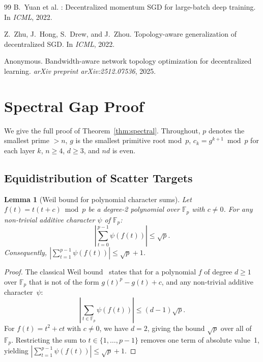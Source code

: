 \documentclass{article}
\newtheorem{lemma}[theorem]{Lemma}
\begin{document}
\begin{thebibliography}{99}
B.~Yuan et al.
: Decentralized momentum {SGD} for large-batch deep training.
\newblock In \emph{ICML}, 2022.

Z.~Zhu, J.~Hong, S.~Drew, and J.~Zhou.
\newblock Topology-aware generalization of decentralized {SGD}.
\newblock In \emph{ICML}, 2022.

Anonymous.
\newblock Bandwidth-aware network topology optimization for decentralized learning.
\newblock \emph{arXiv preprint arXiv:2512.07536}, 2025.

\end{thebibliography}


\appendix

\section{Spectral Gap Proof}
\label{app:spectral_proof}

We give the full proof of Theorem~\ref{thm:spectral}.  Throughout,
$p$ denotes the smallest prime $> n$, $g$ is the smallest primitive root
mod~$p$, $c_k = g^{k+1} \bmod p$ for each layer $k$, $n \ge 4$,
$d \ge 3$, and $nd$ is even.

\subsection{Equidistribution of Scatter Targets}

\begin{lemma}[Weil bound for polynomial character sums]
\label{lem:weil}
Let $f(t) = t(t + c) \bmod p$ be a degree-2 polynomial over
$\mathbb{F}_p$ with $c \ne 0$.  For any non-trivial additive
character $\psi$ of $\mathbb{F}_p$:
\[
\left|\sum_{t=0}^{p-1} \psi(f(t))\right| \le \sqrt{p}.
\]
Consequently, $\left|\sum_{t=1}^{p-1} \psi(f(t))\right| \le \sqrt{p} + 1$.
\end{lemma}
\begin{proof}
The classical Weil bound~\cite{weil1948} states that for a polynomial
$f$ of degree $d \ge 1$ over $\mathbb{F}_p$ that is not of the form
$g(t)^p - g(t) + c$, and any non-trivial additive character~$\psi$:
\[
\left|\sum_{t \in \mathbb{F}_p} \psi(f(t))\right| \le (d-1)\sqrt{p}.
\]
For $f(t) = t^2 + ct$ with $c \ne 0$, we have $d = 2$, giving the
bound $\sqrt{p}$ over all of $\mathbb{F}_p$.  Restricting the sum to
$t \in \{1, \ldots, p-1\}$ removes one term of absolute value~1,
yielding $\left|\sum_{t=1}^{p-1}\psi(f(t))\right| \le \sqrt{p} + 1$.
\end{proof}
\end{document}
